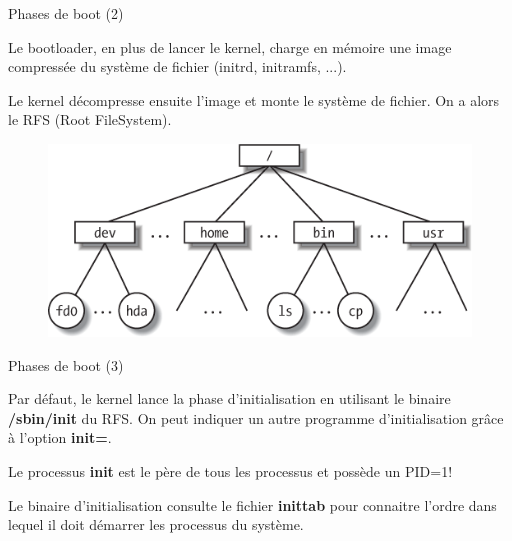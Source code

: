 \documentclass[12pt, t]{beamer}
\begin{document}
\begin{frame}{Phases de boot (2)}

    \vspace{15pt}
    Le bootloader, en plus de lancer le kernel, charge en mémoire une image
    compressée du système de fichier (initrd, initramfs, ...).

    {
        \vspace{15pt}
        Le kernel décompresse ensuite l'image et monte le système de fichier. On
        a alors le RFS (Root FileSystem).

        \begin{figure}
            \centering
            \includegraphics[scale=0.4]{rfs.png}
        \end{figure}
    }

\end{frame}


\begin{frame}{Phases de boot (3)}

    \vspace{15pt}
    Par défaut, le kernel lance la phase d'initialisation en utilisant le binaire
    {\textbf{/sbin/init}} du RFS. On peut indiquer un autre programme
    d'initialisation grâce à l'option {\textbf{init=}}.

    \vspace{10pt}
    \lstboot

    {
        \vspace{10pt}
        Le processus {\textbf{init}} est le père de tous les processus et possède
        un PID=1!
    }

    {
        \vspace{10pt}
        Le binaire d'initialisation consulte le fichier {\textbf{inittab}} pour
        connaitre l'ordre dans lequel il doit démarrer les processus du système.
    }

\end{frame}
\end{document}
